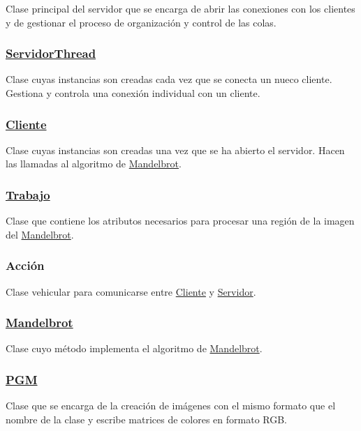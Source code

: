 Clase principal del servidor que se encarga de abrir las conexiones con los clientes y de gestionar el proceso de organización y control de las colas.

\subsubsection*{\hyperlink{classServidorThread}{Servidor\+Thread}}

Clase cuyas instancias son creadas cada vez que se conecta un nueco cliente. Gestiona y controla una conexión individual con un cliente.

\subsubsection*{\hyperlink{classCliente}{Cliente}}

Clase cuyas instancias son creadas una vez que se ha abierto el servidor. Hacen las llamadas al algoritmo de \hyperlink{classMandelbrot}{Mandelbrot}.

\subsubsection*{\hyperlink{classTrabajo}{Trabajo}}

Clase que contiene los atributos necesarios para procesar una región de la imagen del \hyperlink{classMandelbrot}{Mandelbrot}.

\subsubsection*{Acción}

Clase vehicular para comunicarse entre \hyperlink{classCliente}{Cliente} y \hyperlink{classServidor}{Servidor}.

\subsubsection*{\hyperlink{classMandelbrot}{Mandelbrot}}

Clase cuyo método implementa el algoritmo de \hyperlink{classMandelbrot}{Mandelbrot}.

\subsubsection*{\hyperlink{classPGM}{P\+GM}}

Clase que se encarga de la creación de imágenes con el mismo formato que el nombre de la clase y escribe matrices de colores en formato R\+GB. 